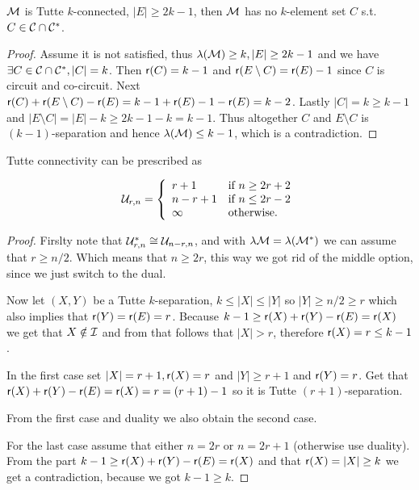 \begin{lemma}
	$\mathcal{M}$ is Tutte $k$-connected, $|E| \geq 2k-1$, then $\mathcal{M}$ has no $k$-element set $C$ s.t. $C \in \mathcal{C} \cap \mathcal{C}^{\ast}$.
\end{lemma}

\begin{proof}
	Assume it is not satisfied, thus $\lambda(\mathcal{M}) \geq k, |E| \geq 2k-1$ and we have $\exists C \in \mathcal{C} \cap \mathcal{C}^{\ast}, |C| = k$. Then $\operatorname{\mathsf{r}}(C) = k-1$ and $\operatorname{\mathsf{r}}(E \setminus C) = \operatorname{\mathsf{r}}(E) - 1$ since $C$ is circuit and co-circuit. Next $\operatorname{\mathsf{r}}(C) + \operatorname{\mathsf{r}}(E \setminus C) - \operatorname{\mathsf{r}}(E) = k-1 + \operatorname{\mathsf{r}}(E) - 1 - \operatorname{\mathsf{r}}(E) = k-2$. Lastly $|C| = k \geq k-1$ and $|E \setminus C| = |E| - k \geq 2k-1 -k = k-1$. Thus altogether $C$ and $E \setminus C$ is $(k-1)$-separation and hence $\lambda(\mathcal{M}) \leq k-1$, which is a contradiction.
\end{proof}

\begin{prop}
	Tutte connectivity can be prescribed as

	$$
	\mathcal{U}_{r,n} = \left\{ \begin{array}{l l}
		r + 1 & \text{if } n \geq 2r + 2 \\
		n - r + 1 & \text{if } n \leq 2 r - 2 \\
		\infty & \text{otherwise.}
	\end{array}
	\right.
	$$
\end{prop}

\begin{proof}
	Firslty note that $\mathcal{U}_{r,n}^{\ast} \cong \mathcal{U}_{n-r,n}$, and with $\lambda{\mathcal{M}} = \lambda(\mathcal{M}^{\ast})$ we can assume \wlogt that $r \geq n /2$. Which means that $n \geq 2r$, this way we got rid of the middle option, since we just switch to the dual.

	Now let $(X,Y)$ be a Tutte $k$-separation, \wlogt $k \leq |X| \leq |Y|$ so $|Y| \geq n/2 \geq r$ which also implies that $\operatorname{\mathsf{r}}(Y) = \operatorname{\mathsf{r}}(E) = r$. Because $k - 1 \geq \operatorname{\mathsf{r}}(X) + \operatorname{\mathsf{r}}(Y) - \operatorname{\mathsf{r}}(E) = \operatorname{\mathsf{r}}(X)$ we get that $X \notin \mathcal{I}$ and from that follows that $|X| > r$, therefore $\operatorname{\mathsf{r}}(X) = r \leq k-1$.

	In the first case set $|X| = r+1, \operatorname{\mathsf{r}}(X) = r$ and $|Y| \geq r+1$ and $\operatorname{\mathsf{r}}(Y) = r$. Get that $\operatorname{\mathsf{r}}(X) + \operatorname{\mathsf{r}}(Y) - \operatorname{\mathsf{r}}(E) = \operatorname{\mathsf{r}}(X) = r = (r+1)-1$ so it is Tutte $(r+1)$-separation.

	From the first case and duality we also obtain the second case.

	For the last case assume that either $n = 2r$ or $n = 2r+1$ (otherwise use duality). From the part $k - 1 \geq \operatorname{\mathsf{r}}(X) + \operatorname{\mathsf{r}}(Y) - \operatorname{\mathsf{r}}(E) = \operatorname{\mathsf{r}}(X)$ and that $\operatorname{\mathsf{r}}(X) = |X| \geq k$ we get a contradiction, because we got $k- 1 \geq k$.
\end{proof}

